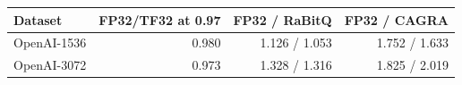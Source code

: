 \begin{tabular}{@{}lrrr@{}}
\toprule
Dataset & FP32/TF32 at 0.97 & FP32 / RaBitQ & FP32 / CAGRA \\
\midrule
OpenAI-1536 & 0.980 & 1.126 / 1.053 & 1.752 / 1.633 \\
OpenAI-3072 & 0.973 & 1.328 / 1.316 & 1.825 / 2.019 \\
\bottomrule
\end{tabular}
